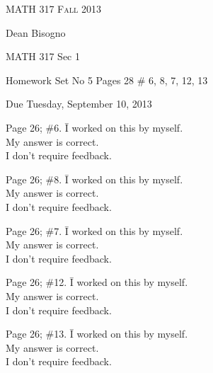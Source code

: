 \begin{titlepage}
\begin{center}
\textsc{\Large MATH 317 Fall 2013}\\[1.0cm]
\end{center}
\begin{flushleft}					
Dean Bisogno

MATH 317 Sec 1

Homework Set No 5 Pages 28 \# 6, 8, 7, 12, 13

Due Tuesday, September 10, 2013
\vspace{10 mm}
\begin{tabbing}	
Page 26; \#6. \= I worked on this by myself. \\
	\> My answer is correct.\\
	\>I don’t require feedback. \\
\end{tabbing}
\begin{tabbing}	
Page 26; \#8. \= I worked on this by myself. \\
	\> My answer is correct.\\
	\>I don’t require feedback. \\
\end{tabbing}
\begin{tabbing}	
Page 26; \#7. \= I worked on this by myself. \\
	\> My answer is correct.\\
	\>I don’t require feedback. \\
\end{tabbing}
\begin{tabbing}	
Page 26; \#12. \= I worked on this by myself. \\
	\> My answer is correct.\\
	\>I don’t require feedback. \\
\end{tabbing}
\begin{tabbing}	
Page 26; \#13. \= I worked on this by myself. \\
	\> My answer is correct.\\
	\>I don’t require feedback. \\
\end{tabbing}
\end{flushleft}
\end{titlepage}